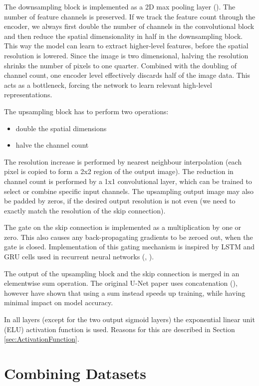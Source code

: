 The downsampling block is implemented as a 2D max pooling layer (\cite{DeepLearningBook}). The number of feature channels is preserved. If we track the feature count through the encoder, we always first double the number of channels in the convolutional block and then reduce the spatial dimensionality in half in the downsampling block. This way the model can learn to extract higher-level features, before the spatial resolution is lowered. Since the image is two dimensional, halving the resolution shrinks the number of pixels to one quarter. Combined with the doubling of channel count, one encoder level effectively discards half of the image data. This acts as a bottleneck, forcing the network to learn relevant high-level representations.

The upsampling block has to perform two operations:

\begin{itemize}
    \item double the spatial dimensions
    \item halve the channel count
\end{itemize}

The resolution increase is performed by nearest neighbour interpolation (each pixel is copied to form a 2x2 region of the output image). The reduction in channel count is performed by a 1x1 convolutional layer, which can be trained to select or combine specific input channels. The upsampling output image may also be padded by zeros, if the desired output resolution is not even (we need to exactly match the resolution of the skip connection).

The gate on the skip connection is implemented as a multiplication by one or zero. This also causes any back-propagating gradients to be zeroed out, when the gate is closed. Implementation of this gating mechanism is inspired by LSTM and GRU cells used in recurrent neural networks (\cite{LSTM}, \cite{GRU}).

The output of the upsampling block and the skip connection is merged in an elementwise sum operation. The original U-Net paper uses concatenation (\cite{UNet}), however \cite{DorferEtAl} have shown that using a sum instead speeds up training, while having minimal impact on model accuracy.

In all layers (except for the two output sigmoid layers) the exponential linear unit (ELU) activation function is used. Reasons for this are described in Section \ref{sec:ActivationFunction}.


\section{Combining Datasets}

